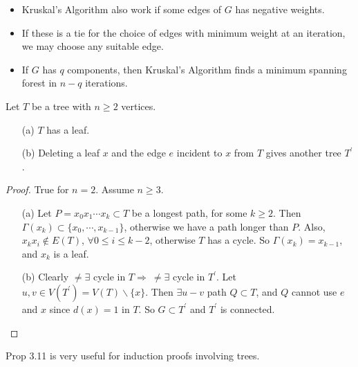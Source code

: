\begin{remark}
    \begin{itemize}
        \item Kruskal's Algorithm also work if some edges of $G$ has negative weights.
        \item If these is a tie for the choice of edges with minimum weight at an iteration, we may choose any suitable edge.
        \item If $G$ has $q$ components, then Kruskal's Algorithm finds a minimum spanning forest in $n-q$ iterations.
    \end{itemize}
\end{remark}

\setcounter{proposition}{10}
\begin{proposition}
    Let $T$ be a tree with $n\geqslant 2$ vertices. 
    \begin{itemize}
        \item[(a)] $T$ has a leaf.
        \item[(b)] Deleting a leaf $x$ and the edge $e$ incident to $x$ from $T$ gives another tree $T^{\prime}$.
    \end{itemize}
\end{proposition}
\begin{proof}
    True for $n=2$. Assume $n\geqslant 3$.
    \begin{itemize}
        \item[(a)] Let $P = x_0 x_1\cdots x_k\subset T$ be a longest path, for some $k\geqslant 2$. Then $\Gamma(x_k)\subset\{x_0,\cdots,x_{k-1}\}$, otherwise we have a path longer than $P$. Also, $x_kx_i\notin E(T)$, $\forall 0\leqslant i\leqslant k-2$, otherwise $T$ has a cycle. So $\Gamma(x_k) = x_{k-1}$, and $x_k$ is a leaf.
        \item[(b)] Clearly $\neq\exists$ cycle in $T\Longrightarrow\ \neq\exists$ cycle in $T^{\prime}$. Let $u,v\in V(T^{\prime}) = V(T)\backslash\{x\}$. Then $\exists u-v$ path $Q\subset T$, and $Q$ cannot use $e$ and $x$ since $d(x)= 1$ in $T$. So $G\subset T^{\prime}$ and $T^{\prime}$ is connected.
    \end{itemize}
\end{proof}

Prop 3.11 is very useful for induction proofs involving trees.

